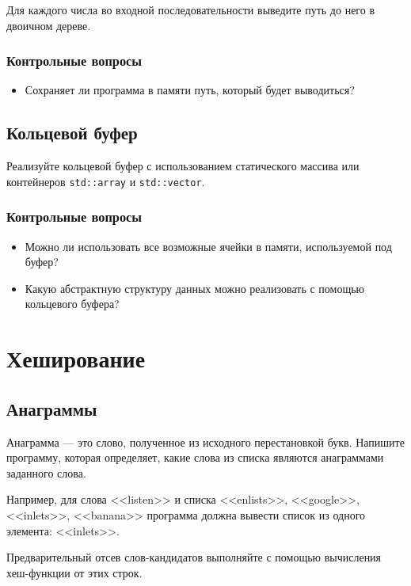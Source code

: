 \documentclass[10pt,twoside,openany]{book}
\begin{document}
Для каждого числа во входной последовательности выведите путь до него в двоичном дереве.

\subsection*{Контрольные вопросы}

\begin{itemize}
    \item Сохраняет ли программа в памяти путь, который будет выводиться?
\end{itemize}

\section{Кольцевой буфер}

Реализуйте кольцевой буфер с использованием статического массива или контейнеров
{\tt std::array} и {\tt std::vector}.

\subsection*{Контрольные вопросы}

\begin{itemize}
    \item Можно ли использовать все возможные ячейки в памяти, используемой под буфер?
    \item Какую абстрактную структуру данных можно реализовать с помощью
          кольцевого буфера?
\end{itemize}

\chapter{Хеширование}

\section{Анаграммы}

Анаграмма --- это слово, полученное из исходного перестановкой букв.
Напишите программу, которая определяет, какие слова из списка являются анаграммами
заданного слова.

Например, для слова <<listen>> и списка <<enlists>>, <<google>>, <<inlets>>, <<banana>>
программа должна вывести список из одного элемента: <<inlets>>.

Предварительный отсев слов-кандидатов выполняйте с помощью вычисления
хеш-функции от этих строк.
\end{document}
